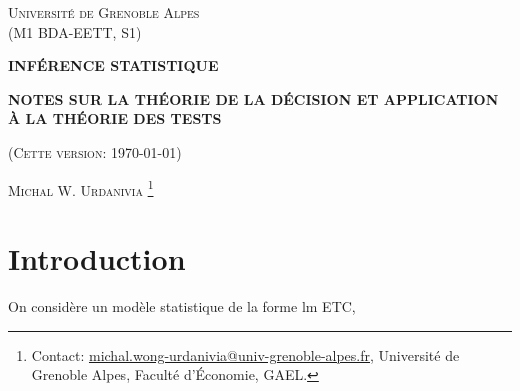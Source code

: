 \documentclass[10pt, reqno]{amsart}
\begin{document}
 
\usetikzlibrary{positioning}
\usetikzlibrary{snakes}
\usetikzlibrary{calc}
\usetikzlibrary{arrows}
\usetikzlibrary{decorations.markings}
\usetikzlibrary{shapes.misc}
\usetikzlibrary{shapes}

%

\begin{titlepage}
\centering
	{\scshape\Large \textsc{Université de Grenoble Alpes\\(M1 BDA-EETT, S1)}\par}
	\vspace{0.5cm}
	{\Large\bfseries \scshape\Large \textsc{INFÉRENCE STATISTIQUE}\par}
	\vspace{0.5cm}
	{\Large\bfseries \textsc{NOTES SUR LA THÉORIE DE LA DÉCISION ET APPLICATION À LA THÉORIE DES TESTS} \par}
    \vspace{0.5cm}   
	{(\textsc{Cette version: \today})\par}
	\vspace{1cm}
	{\large \textsc{Michal W. Urdanivia}
	\footnote{Contact:  
	\href{mailto:michal.wong-urdanivia@univ-grenoble-alpes.fr}{michal.wong-urdanivia@univ-grenoble-alpes.fr}, 
	 Université de Grenoble Alpes,  Faculté d'\'Economie, GAEL.}\par}
	
\end{titlepage}


\newpage

\tableofcontents

\newpage

\section{Introduction} 
On considère un modèle statistique de la forme lm ETC,
\end{document}
